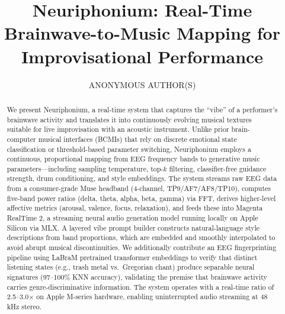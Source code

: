 \documentclass[manuscript,review,anonymous]{acmart}
\begin{document}
\title{Neuriphonium: Real-Time Brainwave-to-Music Mapping for Improvisational Performance}

\author{ANONYMOUS AUTHOR(S)}

\begin{abstract}
We present Neuriphonium, a real-time system that captures the ``vibe'' of a performer's brainwave activity and translates it into continuously evolving musical textures suitable for live improvisation with an acoustic instrument. Unlike prior brain-computer musical interfaces (BCMIs) that rely on discrete emotional state classification or threshold-based parameter switching, Neuriphonium employs a continuous, proportional mapping from EEG frequency bands to generative music parameters---including sampling temperature, top-$k$ filtering, classifier-free guidance strength, drum conditioning, and style embeddings. The system streams raw EEG data from a consumer-grade Muse headband (4-channel, TP9/AF7/AF8/TP10), computes five-band power ratios (delta, theta, alpha, beta, gamma) via FFT, derives higher-level affective metrics (arousal, valence, focus, relaxation), and feeds these into Magenta RealTime 2, a streaming neural audio generation model running locally on Apple Silicon via MLX. A layered vibe prompt builder constructs natural-language style descriptions from band proportions, which are embedded and smoothly interpolated to avoid abrupt musical discontinuities. We additionally contribute an EEG fingerprinting pipeline using LaBraM pretrained transformer embeddings to verify that distinct listening states (e.g., trash metal vs.\ Gregorian chant) produce separable neural signatures (97--100\% KNN accuracy), validating the premise that brainwave activity carries genre-discriminative information. The system operates with a real-time ratio of 2.5--3.0$\times$ on Apple M-series hardware, enabling uninterrupted audio streaming at 48\,kHz stereo.
\end{abstract}



\maketitle
\end{document}
